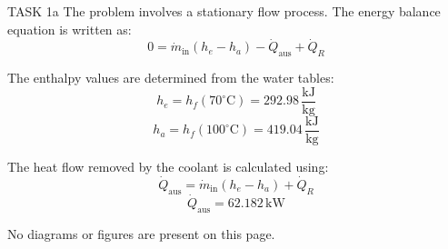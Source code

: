 TASK 1a  
The problem involves a stationary flow process. The energy balance equation is written as:  
\[
0 = \dot{m}_{\text{in}} \left( h_e - h_a \right) - \dot{Q}_{\text{aus}} + \dot{Q}_R
\]  

The enthalpy values are determined from the water tables:  
\[
h_e = h_f(70^\circ\text{C}) = 292.98 \, \frac{\text{kJ}}{\text{kg}}
\]  
\[
h_a = h_f(100^\circ\text{C}) = 419.04 \, \frac{\text{kJ}}{\text{kg}}
\]  

The heat flow removed by the coolant is calculated using:  
\[
\dot{Q}_{\text{aus}} = \dot{m}_{\text{in}} \left( h_e - h_a \right) + \dot{Q}_R
\]  
\[
\dot{Q}_{\text{aus}} = 62.182 \, \text{kW}
\]  

No diagrams or figures are present on this page.